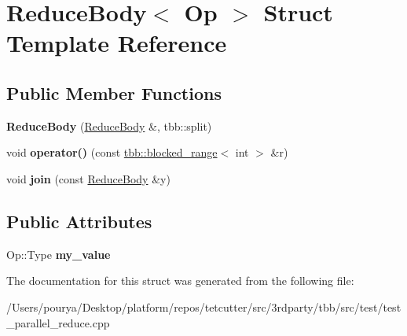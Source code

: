 \hypertarget{structReduceBody}{}\section{Reduce\+Body$<$ Op $>$ Struct Template Reference}
\label{structReduceBody}
\subsection*{Public Member Functions}
\begin{DoxyCompactItemize}
\item 
\hypertarget{structReduceBody_ae38fa8fd8d858453d36eb54b86e8b549}{}{\bfseries Reduce\+Body} (\hyperlink{structReduceBody}{Reduce\+Body} \&, tbb\+::split)\label{structReduceBody_ae38fa8fd8d858453d36eb54b86e8b549}

\item 
\hypertarget{structReduceBody_af4e12f5f9e0b28ff0ff3dec1fb45ecd5}{}void {\bfseries operator()} (const \hyperlink{classtbb_1_1blocked__range}{tbb\+::blocked\+\_\+range}$<$ int $>$ \&r)\label{structReduceBody_af4e12f5f9e0b28ff0ff3dec1fb45ecd5}

\item 
\hypertarget{structReduceBody_af10a368567ad13a2c8ece3d8ba33939d}{}void {\bfseries join} (const \hyperlink{structReduceBody}{Reduce\+Body} \&y)\label{structReduceBody_af10a368567ad13a2c8ece3d8ba33939d}

\end{DoxyCompactItemize}
\subsection*{Public Attributes}
\begin{DoxyCompactItemize}
\item 
\hypertarget{structReduceBody_a237027157d40097605155f3814dfa586}{}Op\+::\+Type {\bfseries my\+\_\+value}\label{structReduceBody_a237027157d40097605155f3814dfa586}

\end{DoxyCompactItemize}


The documentation for this struct was generated from the following file\+:\begin{DoxyCompactItemize}
\item 
/\+Users/pourya/\+Desktop/platform/repos/tetcutter/src/3rdparty/tbb/src/test/test\+\_\+parallel\+\_\+reduce.\+cpp\end{DoxyCompactItemize}
